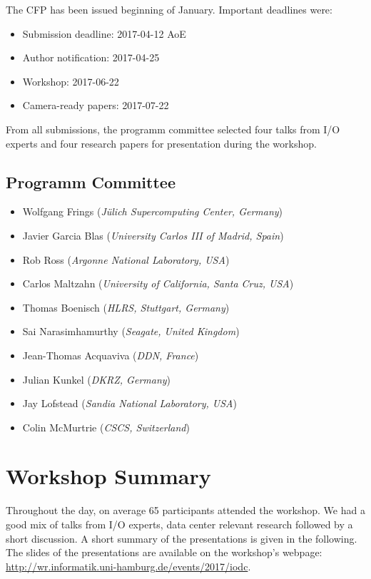 \documentclass{llncs}
\begin{document}
\noindent The CFP has been issued beginning of January.
Important deadlines were:
\begin{itemize}
  \item Submission deadline: 2017-04-12 AoE
  \item Author notification: 2017-04-25
  \item Workshop: 2017-06-22
  \item Camera-ready papers: 2017-07-22
\end{itemize}

From all submissions, the programm committee selected four talks from I/O experts and four research papers for presentation during the workshop.

\subsection{Programm Committee}
\begin{itemize}
  \item Wolfgang Frings (\textit{Jülich Supercomputing Center, Germany})
  \item Javier Garcia Blas (\textit{University Carlos III of Madrid, Spain})
  \item  Rob Ross (\textit{Argonne National Laboratory, USA})
  \item   Carlos Maltzahn (\textit{University of California, Santa Cruz, USA})
  \item  Thomas Boenisch (\textit{HLRS, Stuttgart, Germany})
  \item  Sai Narasimhamurthy (\textit{Seagate, United Kingdom})
  \item Jean-Thomas Acquaviva (\textit{DDN, France})
  \item  Julian Kunkel (\textit{DKRZ, Germany})
  \item  Jay Lofstead (\textit{Sandia National Laboratory, USA})
  \item  Colin McMurtrie (\textit{CSCS, Switzerland})
\end{itemize}



\section{Workshop Summary}
\label{sec:summary}

Throughout the day, on average 65 participants attended the workshop.
We had a good mix of talks from I/O experts, data center relevant research followed by a short discussion.
A short summary of the presentations is given in the following.
The slides of the presentations are available on the workshop's webpage: \\
\url{http://wr.informatik.uni-hamburg.de/events/2017/iodc}.
\end{document}

